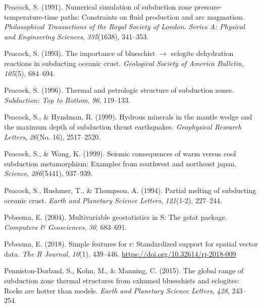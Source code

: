 \begin{CSLReferences}{1}{1}
\leavevmode{}%
Peacock, S. (1991). Numerical simulation of subduction zone pressure-temperature-time paths: Constraints on fluid production and arc magmatism. \emph{Philosophical Transactions of the Royal Society of London. Series A: Physical and Engineering Sciences}, \emph{335}(1638), 341--353.

\leavevmode{}%
Peacock, S. (1993). The importance of blueschist \(\rightarrow\) eclogite dehydration reactions in subducting oceanic crust. \emph{Geological Society of America Bulletin}, \emph{105}(5), 684--694.

\leavevmode{}%
Peacock, S. (1996). Thermal and petrologic structure of subduction zones. \emph{Subduction: Top to Bottom}, \emph{96}, 119--133.

\leavevmode{}%
Peacock, S., \& Hyndman, R. (1999). Hydrous minerals in the mantle wedge and the maximum depth of subduction thrust earthquakes. \emph{Geophysical Research Letters}, \emph{26}(No. 16), 2517--2520.

\leavevmode{}%
Peacock, S., \& Wang, K. (1999). Seismic consequences of warm versus cool subduction metamorphism: Examples from southwest and northeast japan. \emph{Science}, \emph{286}(5441), 937--939.

\leavevmode{}%
Peacock, S., Rushmer, T., \& Thompson, A. (1994). Partial melting of subducting oceanic crust. \emph{Earth and Planetary Science Letters}, \emph{121}(1-2), 227--244.

\leavevmode{}%
Pebesma, E. (2004). Multivariable geostatistics in {S}: The gstat package. \emph{Computers \& Geosciences}, \emph{30}, 683--691.

\leavevmode{}%
Pebesma, E. (2018). Simple features for r: Standardized support for spatial vector data. \emph{The R Journal}, \emph{10}(1), 439--446. \url{https://doi.org/10.32614/rj-2018-009}

\leavevmode{}%
Penniston-Dorland, S., Kohn, M., \& Manning, C. (2015). The global range of subduction zone thermal structures from exhumed blueschists and eclogites: Rocks are hotter than models. \emph{Earth and Planetary Science Letters}, \emph{428}, 243--254.


\end{CSLReferences}

